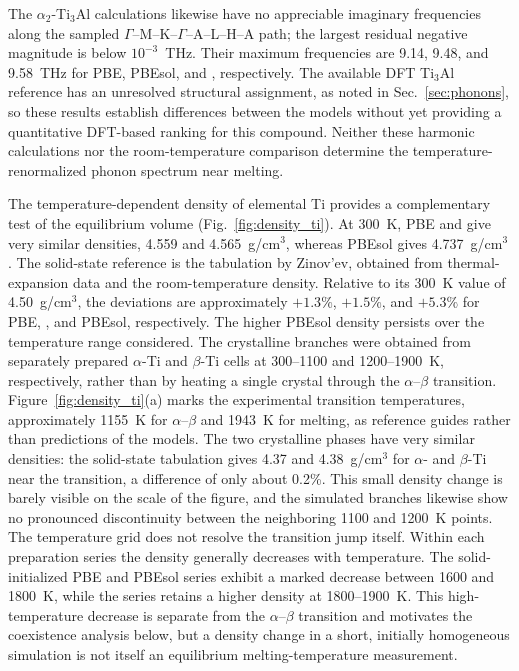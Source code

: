 The $\alpha_2$-Ti$_3$Al calculations likewise have no appreciable imaginary frequencies along the sampled $\Gamma$--M--K--$\Gamma$--A--L--H--A path; the largest residual negative magnitude is below $10^{-3}$~THz.
Their maximum frequencies are 9.14, 9.48, and 9.58~THz for PBE, PBEsol, and \rscan{}, respectively.
The available DFT Ti$_3$Al reference has an unresolved structural assignment, as noted in Sec.~\ref{sec:phonons}, so these results establish differences between the models without yet providing a quantitative DFT-based ranking for this compound.
Neither these harmonic calculations nor the room-temperature comparison determine the temperature-renormalized phonon spectrum near melting.

The temperature-dependent density of elemental Ti provides a complementary test of the equilibrium volume (Fig.~\ref{fig:density_ti}).
At 300~K, PBE and \rscan{} give very similar densities, 4.559 and 4.565~g/cm$^3$, whereas PBEsol gives 4.737~g/cm$^3$.
The solid-state reference is the tabulation by Zinov'ev,\cite{Zinoviev1989} obtained from thermal-expansion data and the room-temperature density.
Relative to its 300~K value of 4.50~g/cm$^3$, the deviations are approximately $+1.3\%$, $+1.5\%$, and $+5.3\%$ for PBE, \rscan{}, and PBEsol, respectively.
The higher PBEsol density persists over the temperature range considered.
The crystalline branches were obtained from separately prepared $\alpha$-Ti and $\beta$-Ti cells at 300--1100 and 1200--1900~K, respectively, rather than by heating a single crystal through the $\alpha$--$\beta$ transition.
Figure~\ref{fig:density_ti}(a) marks the experimental transition temperatures, approximately 1155~K for $\alpha$--$\beta$ and 1943~K for melting, as reference guides rather than predictions of the models.
The two crystalline phases have very similar densities: the solid-state tabulation gives 4.37 and 4.38~g/cm$^3$ for $\alpha$- and $\beta$-Ti near the transition, a difference of only about 0.2\%.
This small density change is barely visible on the scale of the figure, and the simulated branches likewise show no pronounced discontinuity between the neighboring 1100 and 1200~K points.
The temperature grid does not resolve the transition jump itself.
Within each preparation series the density generally decreases with temperature.
The solid-initialized PBE and PBEsol series exhibit a marked decrease between 1600 and 1800~K, while the \rscan{} series retains a higher density at 1800--1900~K.
This high-temperature decrease is separate from the $\alpha$--$\beta$ transition and motivates the coexistence analysis below, but a density change in a short, initially homogeneous simulation is not itself an equilibrium melting-temperature measurement.

